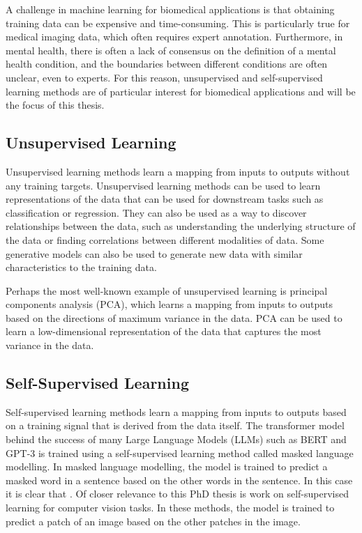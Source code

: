 A challenge in machine learning for biomedical applications is that obtaining training data can be expensive and time-consuming. This is particularly true for medical imaging data, which often requires expert annotation. Furthermore, in mental health, there is often a lack of consensus on the definition of a mental health condition, and the boundaries between different conditions are often unclear, even to experts. For this reason, unsupervised and self-supervised learning methods are of particular interest for biomedical applications and will be the focus of this thesis.

\subsection{Unsupervised Learning}

Unsupervised learning methods learn a mapping from inputs to outputs without any training targets. Unsupervised learning methods can be used to learn representations of the data that can be used for downstream tasks such as classification or regression. They can also be used as a way to discover relationships between the data, such as understanding the underlying structure of the data or finding correlations between different modalities of data. Some generative models can also be used to generate new data with similar characteristics to the training data.

Perhaps the most well-known example of unsupervised learning is principal components analysis (PCA), which learns a mapping from inputs to outputs based on the directions of maximum variance in the data. PCA can be used to learn a low-dimensional representation of the data that captures the most variance in the data.

\subsection{Self-Supervised Learning}

Self-supervised learning methods learn a mapping from inputs to outputs based on a training signal that is derived from the data itself. The transformer model behind the success of many Large Language Models (LLMs) such as BERT \cite{devlin2018bert} and GPT-3 \cite{brown2020language} is trained using a self-supervised learning method called masked language modelling. In masked language modelling, the model is trained to predict a masked word in a sentence based on the other words in the sentence. In this case it is clear that . Of closer relevance to this PhD thesis is work on self-supervised learning for computer vision tasks. In these methods, the model is trained to predict a patch of an image based on the other patches in the image.

